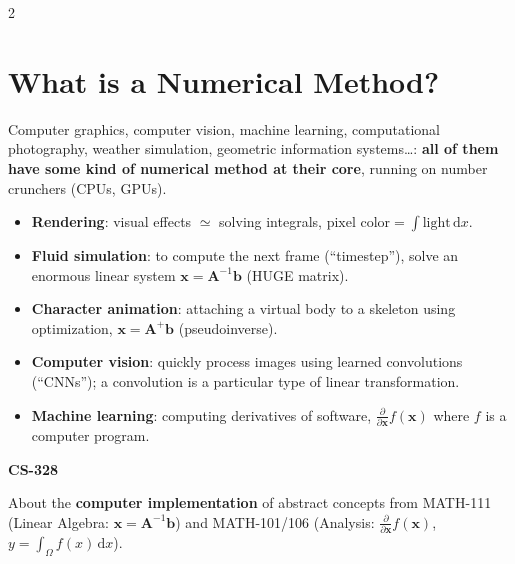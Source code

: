 \documentclass[a4paper,9pt]{extarticle}
\begin{document}
\begin{multicols}{2}
\section{What is a Numerical Method?}


\begin{important}

Computer graphics, computer vision, machine learning, computational photography, weather
simulation, geometric information systems\dots: \textbf{all of them have some kind of numerical
method at their core}, running on number crunchers (CPUs, GPUs).

\end{important}


\begin{example}

\begin{itemize}

\item \textbf{Rendering}: visual effects $\simeq$ solving integrals,
$\text{pixel color} = \int \text{light}\,\mathrm{d}x$.

\item \textbf{Fluid simulation}: to compute the next frame (``timestep''), solve an enormous
linear system $\mathbf{x} = \mathbf{A}^{-1}\mathbf{b}$ (HUGE matrix).

\item \textbf{Character animation}: attaching a virtual body to a skeleton using optimization,
$\mathbf{x} = \mathbf{A}^{+}\mathbf{b}$ (pseudoinverse).

\item \textbf{Computer vision}: quickly process images using learned convolutions (``CNNs''); a
convolution is a particular type of linear transformation.

\item \textbf{Machine learning}: computing derivatives of software,
$\frac{\partial}{\partial \mathbf{x}} f(\mathbf{x})$ where $f$ is a computer program.

\end{itemize}

\end{example}


\begin{definition}

\textbf{CS-328}

About the \textbf{computer implementation} of abstract concepts from MATH-111 (Linear Algebra:
$\mathbf{x} = \mathbf{A}^{-1}\mathbf{b}$) and MATH-101/106 (Analysis:
$\frac{\partial}{\partial \mathbf{x}} f(\mathbf{x})$, $y = \int_\Omega f(x)\,\mathrm{d}x$).


\end{definition}
\end{multicols}
\end{document}

